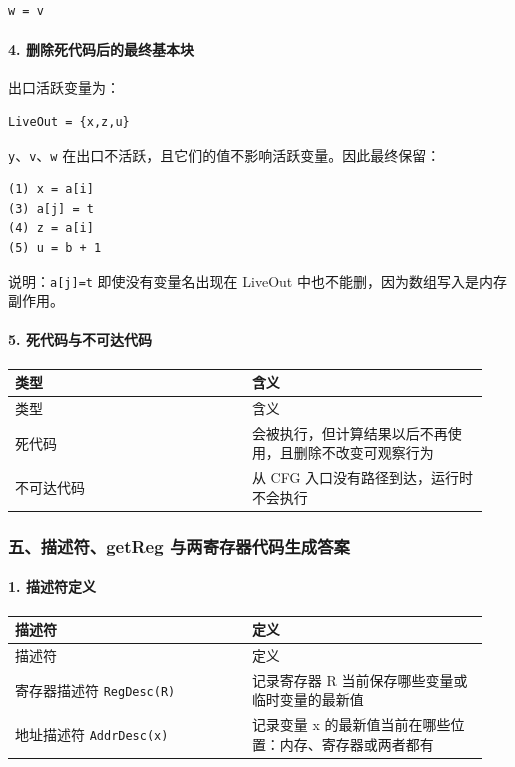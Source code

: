 \documentclass[UTF8]{ctexart}
\begin{document}
\begin{Verbatim}[fontsize=\small,breaklines=true]
w = v
\end{Verbatim}

\paragraph*{4. 删除死代码后的最终基本块}

出口活跃变量为：

\begin{Verbatim}[fontsize=\small,breaklines=true]
LiveOut = {x,z,u}
\end{Verbatim}

\texttt{y}、\texttt{v}、\texttt{w} 在出口不活跃，且它们的值不影响活跃变量。因此最终保留：

\begin{Verbatim}[fontsize=\small,breaklines=true]
(1) x = a[i]
(3) a[j] = t
(4) z = a[i]
(5) u = b + 1
\end{Verbatim}

说明：\texttt{a[j]=t} 即使没有变量名出现在 LiveOut 中也不能删，因为数组写入是内存副作用。

\paragraph*{5. 死代码与不可达代码}

\begin{longtable}{|p{0.47\linewidth}|p{0.47\linewidth}|}
\hline
类型 & 含义 \\
\hline
\endfirsthead
类型 & 含义 \\
\hline
\endhead
死代码 & 会被执行，但计算结果以后不再使用，且删除不改变可观察行为 \\
\hline
不可达代码 & 从 CFG 入口没有路径到达，运行时不会执行 \\
\hline
\end{longtable}

\subsubsection*{五、描述符、getReg 与两寄存器代码生成答案}

\paragraph*{1. 描述符定义}

\begin{longtable}{|p{0.47\linewidth}|p{0.47\linewidth}|}
\hline
描述符 & 定义 \\
\hline
\endfirsthead
描述符 & 定义 \\
\hline
\endhead
寄存器描述符 \texttt{RegDesc(R)} & 记录寄存器 R 当前保存哪些变量或临时变量的最新值 \\
\hline
地址描述符 \texttt{AddrDesc(x)} & 记录变量 x 的最新值当前在哪些位置：内存、寄存器或两者都有 \\
\hline
\end{longtable}
\end{document}
